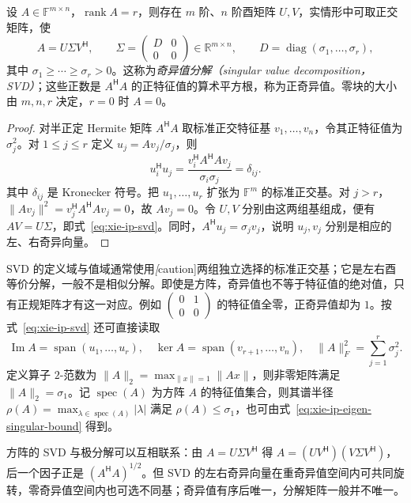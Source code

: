 \begin{theorem}
\label{thm:xie-ip-svd}
设 $A\in\mathbb F^{m\times n}$，$\operatorname{rank}A=r$，则存在 $m$ 阶、$n$ 阶酉矩阵 $U,V$，实情形中可取正交矩阵，使
\begin{equation}
\label{eq:xie-ip-svd}
A=U\Sigma V^{\mathsf H},\qquad
\Sigma=\begin{pmatrix}D&0\\0&0\end{pmatrix}\in\mathbb R^{m\times n},
\qquad D=\operatorname{diag}(\sigma_1,\ldots,\sigma_r),
\end{equation}
其中 $\sigma_1\geq\cdots\geq\sigma_r>0$。这称为\emph{奇异值分解（singular value decomposition，SVD）}；这些正数是 $A^{\mathsf H}A$ 的正特征值的算术平方根，称为正奇异值。零块的大小由 $m,n,r$ 决定，$r=0$ 时 $A=0$。
\end{theorem}
\begin{proof}
对半正定 Hermite 矩阵 $A^{\mathsf H}A$ 取标准正交特征基 $v_1,\ldots,v_n$，令其正特征值为 $\sigma_j^2$。对 $1\leq j\leq r$ 定义 $u_j=Av_j/\sigma_j$，则
\[
u_i^{\mathsf H}u_j=\frac{v_i^{\mathsf H}A^{\mathsf H}Av_j}{\sigma_i\sigma_j}=\delta_{ij}.
\]
其中 $\delta_{ij}$ 是 Kronecker 符号。把 $u_1,\ldots,u_r$ 扩张为 $\mathbb F^m$ 的标准正交基。对 $j>r$，$\|Av_j\|^2=v_j^{\mathsf H}A^{\mathsf H}Av_j=0$，故 $Av_j=0$。令 $U,V$ 分别由这两组基组成，便有 $AV=U\Sigma$，即式~\eqref{eq:xie-ip-svd}。同时，$A^{\mathsf H}u_j=\sigma_jv_j$，说明 $u_j,v_j$ 分别是相应的左、右奇异向量。
\end{proof}

SVD 的定义域与值域通常使用\emph[caution]{两组独立选择的标准正交基}；它是左右酉等价分解，一般不是相似分解。即使是方阵，奇异值也不等于特征值的绝对值，只有正规矩阵才有这一对应。例如 $\begin{pmatrix}0&1\\0&0\end{pmatrix}$ 的特征值全零，正奇异值却为 $1$。按式~\eqref{eq:xie-ip-svd} 还可直接读取
\[
\operatorname{Im}A=\operatorname{span}(u_1,\ldots,u_r),\quad
\ker A=\operatorname{span}(v_{r+1},\ldots,v_n),\quad
\|A\|_F^2=\sum_{j=1}^r\sigma_j^2.
\]
定义算子 $2$-范数为 $\|A\|_2=\max_{\|x\|=1}\|Ax\|$，则非零矩阵满足 $\|A\|_2=\sigma_1$。记 $\operatorname{spec}(A)$ 为方阵 $A$ 的特征值集合，则其谱半径 $\rho(A)=\max_{\lambda\in\operatorname{spec}(A)}|\lambda|$ 满足 $\rho(A)\leq\sigma_1$，也可由式~\eqref{eq:xie-ip-eigen-singular-bound} 得到。

方阵的 SVD 与极分解可以互相联系：由 $A=U\Sigma V^{\mathsf H}$ 得 $A=(UV^{\mathsf H})(V\Sigma V^{\mathsf H})$，后一个因子正是 $(A^{\mathsf H}A)^{1/2}$。但 SVD 的左右奇异向量在重奇异值空间内可共同旋转，零奇异值空间内也可选不同基；奇异值有序后唯一，分解矩阵一般并不唯一。

